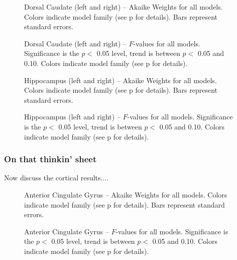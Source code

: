 \documentclass[doc,12pt]{apa}        %
\begin{document}
\begin{figure}[tp]
    \centering
    \caption{Dorsal Caudate (left and right) -- Akaike Weights for all models.  Colors indicate model family (see p\pageref{sub:cmb} for details). Bars represent standard errors.}
	\label{fig:caudate}
\end{figure}
\begin{figure}[tp]
    \centering
    \caption{Dorsal Caudate (left and right) -- $F$-values for all models.  Significance is the $p <$ 0.05 level, trend is between $p <$ 0.05 and 0.10.  Colors indicate model family (see p\pageref{sub:cmb} for details).}
	\label{fig:fvalcaudate}
\end{figure}



\begin{figure}[tp]
    \centering
    \caption{Hippocampus (left and right) -- Akaike Weights for all models.  Colors indicate model family (see p\pageref{sub:cmb} for details). Bars represent standard errors.}
	\label{fig:hippocampus}
\end{figure}
\begin{figure}[tp]
    \centering
    \caption{Hippocampus (left and right) -- $F$-values for all models.  Significance is the $p <$ 0.05 level, trend is between $p <$ 0.05 and 0.10.  Colors indicate model family (see p\pageref{sub:cmb} for details).}
	\label{fig:fvalhippocampus}
\end{figure}

\subsubsection{On that thinkin' sheet}
\label{subsub:onsheet}
Now discuss the cortical results....

\clearpage
\begin{figure}[tp]
    \centering
    \caption{Anterior Cingulate Gyrus -- Akaike Weights for all models.  Colors indicate model family (see p\pageref{sub:cmb} for details). Bars represent standard errors.}
	\label{fig:ant}
\end{figure}
\begin{figure}[tp]
    \centering
    \caption{Anterior Cingulate Gyrus -- $F$-values for all models.  Significance is the $p <$ 0.05 level, trend is between $p <$ 0.05 and 0.10.  Colors indicate model family (see p\pageref{sub:cmb} for details).}
	\label{fig:fvalant}
\end{figure}
\end{document}
